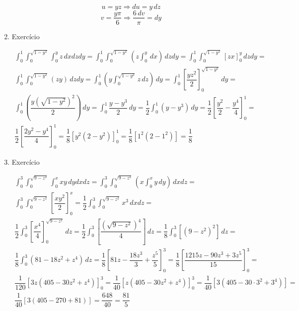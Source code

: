 \begin{enumerate}
\begin{align*}
	\end{align*}
	\begin{equation*}
		u = yz \Rightarrow du = y\, dz
	\end{equation*}
	\begin{equation*}
		v = \dfrac{y\pi}{6} \Rightarrow \dfrac{6\, dv}{\pi} = dy
	\end{equation*}
	
	\item Exercício
	
	\begin{align*}
			\int_0^1 \int_0^{\sqrt{1 - y^2}} \int_0^y z\, dxdzdy = \int_0^1 \int_0^{\sqrt{1 - y^2}}\left(z\int_0^y\, dx\right)\,dzdy = \int_0^1 \int_0^{\sqrt{1 - y^2}} \left[zx\right]_0^y\,dzdy =\\ \int_0^1 \int_0^{\sqrt{1 - y^2}} \left(zy\right)\,dzdy = \int_0^1\left(y\int_0^{\sqrt{1 - y^2}} z\, dz\right)\,dy = \int_0^1 \left[\dfrac{yz^2}{2}\right]_0^{\sqrt{1 - y^2}}\,dy =\\ \int_0^1\left(\dfrac{y\left(\sqrt{1 - y^2}\right)^2}{2}\right)\,dy = \int_0^1\dfrac{y - y^3}{2}\, dy = \dfrac{1}{2}\int_0^1\left(y - y^3\right)\, dy = \dfrac{1}{2} \left[\dfrac{y^2}{2} - \dfrac{y^4}{4}\right]_0^1 =\\ \dfrac{1}{2} \left[\dfrac{2y^2 - y^4}{4}\right]_0^1 = \dfrac{1}{8}\left[y^2\left(2 - y^2\right)\right]_0^1 = \dfrac{1}{8}\left[1^2\left(2 - 1^2\right)\right] = \dfrac{1}{8}
	\end{align*}
	
	\item Exercício
	
	\begin{align*}
		\int_0^3 \int_0^{\sqrt{9 - z^2}} \int_0^x xy\, dydxdz = \int_0^3 \int_0^{\sqrt{9 - z^2}} \left(x\int_0^x y\, dy\right)\, dxdz =\\ \int_0^3 \int_0^{\sqrt{9 - z^2}} \left[\dfrac{xy^2}{2}\right]_0^x = \dfrac{1}{2}\int_0^3 \int_0^{\sqrt{9 - z^2}} x^3\, dxdz =\\ \dfrac{1}{2}\int_0^3 \left[\dfrac{x^4}{4}\right]_0^{\sqrt{9 - z^2}}\, dz = \dfrac{1}{2}\int_0^3 \left[\dfrac{\left(\sqrt{9 - z^2}\right)^4}{4}\right]\, dz = \dfrac{1}{8}\int_0^3 \left[\left(9 - z^2\right)^2\right]\, dz =\\ \dfrac{1}{8}\int_0^3 \left(81 - 18z^2 + z^4\right)\, dz = \dfrac{1}{8}\left[81z - \dfrac{18z^3}{3} + \dfrac{z^5}{5}\right]_0^3 = \dfrac{1}{8}\left[\dfrac{1215z - 90z^3 + 3z^5}{15}\right]_0^3 =\\ \dfrac{1}{120}\left[3z\left(405 - 30z^2 + z^4\right)\right]_0^3 = \dfrac{1}{40}\left[z\left(405 - 30z^2 + z^4\right)\right]_0^3 = \dfrac{1}{40}\left[3\left(405 - 30\cdot3^2 + 3^4\right)\right] =\\ \dfrac{1}{40}\left[3\left(405 - 270 + 81\right)\right] = \dfrac{648}{40} = \dfrac{81}{5}
	\end{align*}
\end{enumerate}